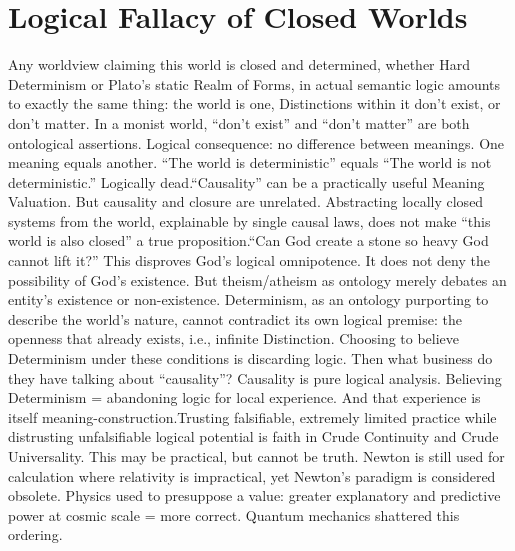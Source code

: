 \documentclass[11pt]{article}
\renewcommand{\\}[1][\mynewlineskip]{\oldnewline[#1]}
\begin{document}
\section{Logical Fallacy of Closed Worlds}
Any worldview claiming this world is closed and determined, whether Hard Determinism or Plato's static Realm of Forms, in actual semantic logic amounts to exactly the same thing: the world is one, Distinctions within it don't exist, or don't matter. In a monist world, ``don't exist'' and ``don't matter'' are both ontological assertions. Logical consequence: no difference between meanings. One meaning equals another. ``The world is deterministic'' equals ``The world is not deterministic.'' Logically dead.\\
``Causality'' can be a practically useful Meaning Valuation. But causality and closure are unrelated. Abstracting locally closed systems from the world, explainable by single causal laws, does not make ``this world is also closed'' a true proposition.\\
``Can God create a stone so heavy God cannot lift it?'' This disproves God's logical omnipotence. It does not deny the possibility of God's existence. But theism/atheism as ontology merely debates an entity's existence or non-existence. Determinism, as an ontology purporting to describe the world's nature, cannot contradict its own logical premise: the openness that already exists, i.e., infinite Distinction. Choosing to believe Determinism under these conditions is discarding logic. Then what business do they have talking about ``causality''? Causality is pure logical analysis. Believing Determinism = abandoning logic for local experience. And that experience is itself meaning-construction.\\
Trusting falsifiable, extremely limited practice while distrusting unfalsifiable logical potential is faith in Crude Continuity and Crude Universality. This may be practical, but cannot be truth. Newton is still used for calculation where relativity is impractical, yet Newton's paradigm is considered obsolete. Physics used to presuppose a value: greater explanatory and predictive power at cosmic scale = more correct. Quantum mechanics shattered this ordering.
\end{document}
